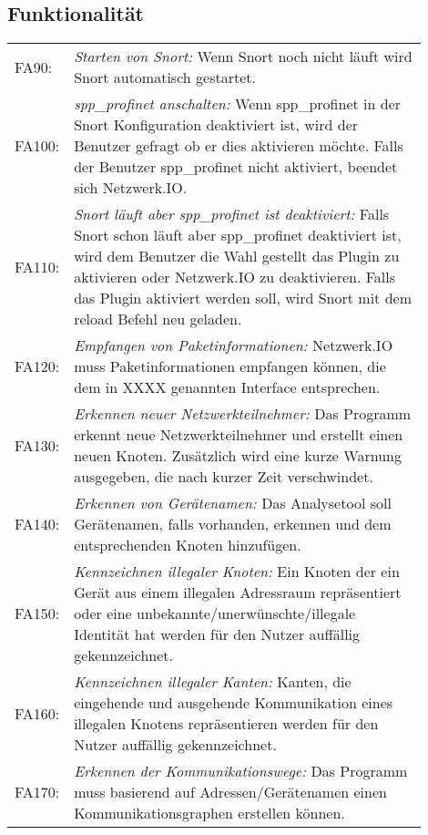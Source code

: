 \subsection{Funktionalität}

\begin{longtable}{lp{0.9\linewidth}}

FA90: & \textit{Starten von Snort: }Wenn Snort noch nicht läuft wird Snort automatisch gestartet. \\

FA100: & \textit{spp\_profinet anschalten: }Wenn spp\_profinet in der Snort Konfiguration deaktiviert ist, wird der Benutzer gefragt ob er dies aktivieren möchte. Falls der Benutzer spp\_profinet nicht aktiviert, beendet sich Netzwerk.IO. \\

FA110: & \textit{Snort läuft aber spp\_profinet ist deaktiviert: }Falls Snort schon läuft aber spp\_profinet deaktiviert ist, wird dem Benutzer die Wahl gestellt das Plugin zu aktivieren oder Netzwerk.IO zu deaktivieren. Falls das Plugin aktiviert werden soll, wird Snort mit dem reload Befehl neu geladen.\\

FA120: & \textit{Empfangen von Paketinformationen: }Netzwerk.IO muss Paketinformationen empfangen können, die dem in XXXX genannten Interface entsprechen. \\

FA130: & \textit{Erkennen neuer Netzwerkteilnehmer: }Das Programm erkennt neue Netzwerkteilnehmer und erstellt einen neuen Knoten. Zusätzlich wird eine kurze Warnung ausgegeben, die nach kurzer Zeit verschwindet. \\

FA140: & \textit{Erkennen von Gerätenamen: }Das Analysetool soll Gerätenamen, falls vorhanden, erkennen und dem entsprechenden Knoten hinzufügen. \\

FA150: & \textit{Kennzeichnen illegaler Knoten: }Ein Knoten der ein Gerät aus einem illegalen Adressraum repräsentiert oder eine unbekannte/unerwünschte/illegale Identität hat werden für den Nutzer auffällig gekennzeichnet. \\

FA160: & \textit{Kennzeichnen illegaler Kanten: }Kanten, die eingehende und ausgehende Kommunikation eines illegalen Knotens repräsentieren werden für den Nutzer auffällig gekennzeichnet. \\

FA170: & \textit{Erkennen der Kommunikationswege: }Das Programm muss basierend auf Adressen/Gerätenamen einen Kommunikationsgraphen erstellen können. \\


\end{longtable}
